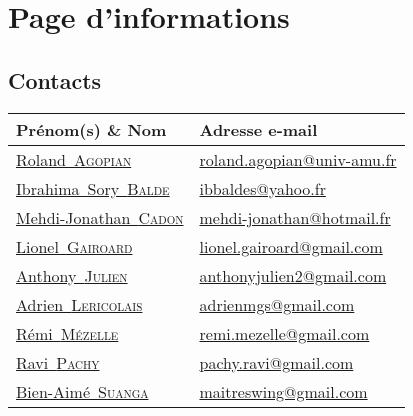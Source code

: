 \documentclass[11pt,fleqn]{book} %
\makeatletter
\newcommand{\roland}{\href{mailto:roland.agopian@univ-amu.fr}{Roland~\textsc{Agopian}}\xspace}
\newcommand{\rolandemail}{\href{mailto:roland.agopian@univ-amu.fr}{roland.agopian@univ-amu.fr}\xspace}
\newcommand{\antho}{\href{mailto:anthonyjulien2@gmail.com}{Anthony~\textsc{Julien}}\xspace}
\newcommand{\remi}{\href{mailto:remi.mezelle@gmail.com}{Rémi~\textsc{Mézelle}}\xspace}
\newcommand{\bienaime}{\href{mailto:maitreswing@gmail.com}{Bien-Aimé~\textsc{Suanga}}\xspace}
\newcommand{\adri}{\href{mailto:adrienmgs@gmail.com}{Adrien~\textsc{Lericolais}}\xspace}
\newcommand{\anthoemail}{\href{mailto:anthonyjulien2@gmail.com}{anthonyjulien2@gmail.com}\xspace}
\newcommand{\remiemail}{\href{mailto:remi.mezelle@gmail.com}{remi.mezelle@gmail.com}\xspace}
\newcommand{\bienaimeemail}{\href{mailto:maitreswing@gmail.com}{maitreswing@gmail.com}\xspace}
\newcommand{\adriemail}{\href{mailto:adrienmgs@gmail.com}{adrienmgs@gmail.com}\xspace}
\newcommand{\ravi}{\href{mailto:pachy.ravi@gmail.com}{Ravi~\textsc{Pachy}}\xspace}
\newcommand{\mj}{\href{mailto:mehdi-jonathan@hotmail.fr}{Mehdi-Jonathan~\textsc{Cadon}}\xspace}
\newcommand{\lionel}{\href{mailto:lionel.gairoard@gmail.com}{Lionel~\textsc{Gairoard}}\xspace}
\newcommand{\ibrahima}{\href{mailto:ibbaldes@yahoo.fr}{Ibrahima~Sory~\textsc{Balde}}\xspace}
\newcommand{\raviemail}{\href{mailto:pachy.ravi@gmail.com}{pachy.ravi@gmail.com}\xspace}
\newcommand{\mjemail}{\href{mailto:mehdi-jonathan@hotmail.fr}{mehdi-jonathan@hotmail.fr}\xspace}
\newcommand{\lionelemail}{\href{mailto:lionel.gairoard@gmail.com}{lionel.gairoard@gmail.com}\xspace}
\newcommand{\ibrahimaemail}{\href{mailto:ibbaldes@yahoo.fr}{ibbaldes@yahoo.fr}\xspace}
\makeatother
\begin{document}






\newpage

\pagestyle{empty} %

\chapter*{Page d'informations}

\section*{Contacts}
\begin{tabularx}{\linewidth}{X X}
	\toprule
	Prénom(s) \& Nom & Adresse e-mail \\
	\midrule
	\roland & \rolandemail \\
	\hline
	\ibrahima & \ibrahimaemail \\
	\hline
	\mj & \mjemail \\
	\hline
	\lionel & \lionelemail \\
	\hline
	\antho & \anthoemail \\
	\hline
	\adri & \adriemail \\
	\hline
	\remi & \remiemail \\
	\hline
	\ravi & \raviemail \\
	\hline
	\bienaime & \bienaimeemail \\
	\bottomrule
\end{tabularx}
\end{document}
